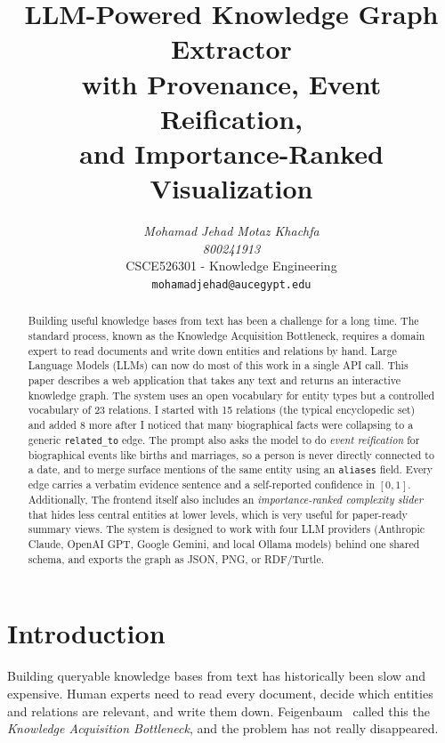 \documentclass[11pt,a4paper]{article}
\title{\bfseries LLM-Powered Knowledge Graph Extractor\\with Provenance, Event Reification,\\and Importance-Ranked Visualization}
\author{
    \textit{Mohamad Jehad Motaz Khachfa}\\
    \textit{800241913}\\
    \small CSCE526301 - Knowledge Engineering\\
    \small \texttt{mohamadjehad@aucegypt.edu}
}
\date{}
\begin{document}
\maketitle

\begin{abstract}
Building useful knowledge bases from text has been a challenge for a long time. The standard process, known as the Knowledge Acquisition Bottleneck, requires a domain expert to read documents and write down entities and relations by hand. Large Language Models (LLMs) can now do most of this work in a single API call. This paper describes a web application that takes any text and returns an interactive knowledge graph. The system uses an open vocabulary for entity types but a controlled vocabulary of 23 relations. I started with 15 relations (the typical encyclopedic set) and added 8 more after I noticed that many biographical facts were collapsing to a generic \texttt{related\_to} edge. The prompt also asks the model to do \emph{event reification} for biographical events like births and marriages, so a person is never directly connected to a date, and to merge surface mentions of the same entity using an \texttt{aliases} field. Every edge carries a verbatim evidence sentence and a self-reported confidence in $[0,1]$. Additionally, The frontend itself also includes an \emph{importance-ranked complexity slider} that hides less central entities at lower levels, which is very useful for paper-ready summary views. The system is designed to work with four LLM providers (Anthropic Claude, OpenAI GPT, Google Gemini, and local Ollama models) behind one shared schema, and exports the graph as JSON, PNG, or RDF/Turtle.


\end{abstract}

\renewcommand{\contentsname}{\normalfont\large\bfseries Table of contents}
{
  \setlength{\parskip}{0pt}
  \tableofcontents
}
\vspace{1em}

\section{Introduction}\label{sec:intro}

Building queryable knowledge bases from text has historically been slow and expensive. Human experts need to read every document, decide which entities and relations are relevant, and write them down. Feigenbaum~\cite{feigenbaum1977art} called this the \emph{Knowledge Acquisition Bottleneck}, and the problem has not really disappeared.
\end{document}
